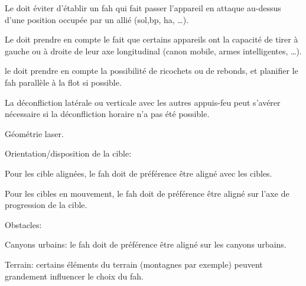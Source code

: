 \begin{e1}
	
	\begin{e2}
		\item Le \ja{} doit éviter d'établir un \gls{fah} qui fait passer l'appareil en attaque au-dessus d'une position occupée par un allié (sol,\gls{bp}, \gls{ha}, \ldots{}).
		
		\item Le \ja{} doit prendre en compte le fait que certains appareils ont la capacité de tirer à gauche ou à droite de leur axe longitudinal (canon mobile, armes intelligentes, \ldots{}).
		
		\item le \ja{} doit prendre en compte la possibilité de ricochets ou de rebonds, et planifier le \gls{fah} parallèle à la \Gls{flot} si possible.
		
	\end{e2}
	
	\item La déconfliction latérale ou verticale avec les autres appuis-feu peut s'avérer nécessaire si la déconfliction horaire n'a pas été possible.
	
	\item Géométrie laser.
	
	\item Orientation/disposition de la cible:
	
	\begin{e2}
		
		\item Pour les cible alignées, le \gls{fah} doit de préférence être aligné avec les cibles.
		
		\item Pour les cibles en mouvement, le \gls{fah} doit de préférence être aligné sur l'axe de progression de la cible.
		
		\item Obstacles:
		
		\begin{e3}
			
			\item Canyons urbains: le \gls{fah} doit de préférence être aligné sur les canyons urbains.
			
			\item Terrain: certains éléments du terrain (montagnes par exemple) peuvent grandement influencer le choix du \gls{fah}.
			

\end{e3}
\end{e2}
\end{e1}
